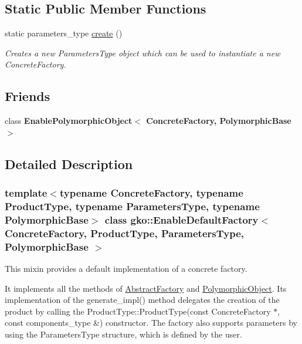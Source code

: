 \subsection*{Static Public Member Functions}
\begin{DoxyCompactItemize}
\item 
static parameters\+\_\+type \hyperlink{classgko_1_1EnableDefaultFactory_a1d077101d9e788e6c65f088612d14cc3}{create} ()
\begin{DoxyCompactList}\small\item\em Creates a new Parameters\+Type object which can be used to instantiate a new Concrete\+Factory. \end{DoxyCompactList}\end{DoxyCompactItemize}
\subsection*{Friends}
\begin{DoxyCompactItemize}
\item 
\mbox{\label{classgko_1_1EnableDefaultFactory_a01a6ad051cccd6915df38622922a5bb6}} 
class {\bfseries Enable\+Polymorphic\+Object$<$ Concrete\+Factory, Polymorphic\+Base $>$}
\end{DoxyCompactItemize}


\subsection{Detailed Description}
\subsubsection*{template$<$typename Concrete\+Factory, typename Product\+Type, typename Parameters\+Type, typename Polymorphic\+Base$>$\newline
class gko\+::\+Enable\+Default\+Factory$<$ Concrete\+Factory, Product\+Type, Parameters\+Type, Polymorphic\+Base $>$}

This mixin provides a default implementation of a concrete factory. 

It implements all the methods of \hyperlink{classgko_1_1AbstractFactory}{Abstract\+Factory} and \hyperlink{classgko_1_1PolymorphicObject}{Polymorphic\+Object}. Its implementation of the generate\+\_\+impl() method delegates the creation of the product by calling the {\ttfamily Product\+Type\+::\+Product\+Type(const Concrete\+Factory $\ast$, const components\+\_\+type \&)} constructor. The factory also supports parameters by using the {\ttfamily Parameters\+Type} structure, which is defined by the user.

